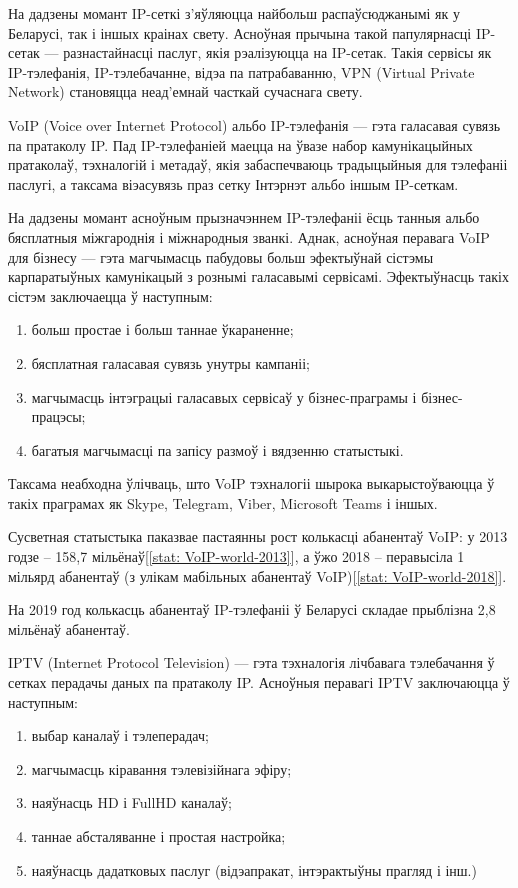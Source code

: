 \sectionWithoutNumber{\prefacename}

На дадзены момант IP-сеткі з'яўляюцца найбольш распаўсюджанымі як
у Беларусі, так і іншых краінах свету. Асноўная прычына такой
папулярнасці IP-сетак --- разнастайнасці паслуг, якія рэалізуюцца
на IP-сетак. Такія сервісы як IP-тэлефанія, IP-тэлебачанне, відэа
па патрабаванню, VPN (Virtual Private Network) становяцца
неад'емнай часткай сучаснага свету.

VoIP (Voice over Internet Protocol) альбо IP-тэлефанія --- гэта
галасавая сувязь па пратаколу IP. Пад IP-тэлефаніей маецца на ўвазе
набор камунікацыйных пратаколаў, тэхналогій і метадаў, якія
забаспечваюць традыцыйныя для тэлефаніі паслугі, а таксама віэасувязь
праз сетку Інтэрнэт альбо іншым IP-сеткам.

На дадзены момант асноўным прызначэннем IP-тэлефаніі ёсць танныя альбо
бяс\-плат\-ныя міжгароднія і міжнародныя званкі. Аднак, асноўная перавага
VoIP для бізнесу --- гэта магчымасць пабудовы больш эфектыўнай сістэмы
карпаратыўных камунікацый з рознымі галасавымі сервісамі.
Эфектыўнасць такіх сістэм заключаецца ў наступным:
\begin{enumerate}
    \item больш простае і больш таннае ўкараненне;
    \item бясплатная галасавая сувязь унутры кампаніі;
    \item магчымасць інтэграцыі галасавых сервісаў у
          бізнес-праграмы і бізнес-працэсы;
    \item багатыя магчымасці па запісу размоў і вядзенню статыстыкі.
\end{enumerate}

Таксама неабходна ўлічваць, што VoIP тэхналогіі шырока
выкарыстоўваюцца ў такіх праграмах як Skype, Telegram, Viber,
Microsoft Teams і іншых.

Сусветная статыстыка паказвае пастаянны рост колькасці
абанентаў VoIP: у 2013 годзе -- 158,7 мільёнаў[\ref{stat: VoIP-world-2013}],
а ўжо 2018 -- перавысіла 1 мільярд абанентаў (з улікам мабільных абанентаў VoIP)[\ref{stat: VoIP-world-2018}].

На 2019 год колькасць абанентаў IP-тэлефаніі ў Беларусі складае
прыблізна 2,8 мі\-льёнаў абанентаў.

IPTV (Internet Protocol Television) --- гэта тэхналогія лічбавага
тэлебачання ў сетках перадачы даных па пратаколу IP.
Асноўныя перавагі IPTV заключаюцца ў наступным:
\begin{enumerate}
    \item выбар каналаў і тэлеперадач;
    \item магчымасць кіравання тэлевізійнага эфіру;
    \item наяўнасць HD і FullHD каналаў;
    \item таннае абсталяванне і простая настройка;
    \item наяўнасць дадатковых паслуг (відэапракат, інтэрактыўны прагляд
          і інш.)
\end{enumerate}

